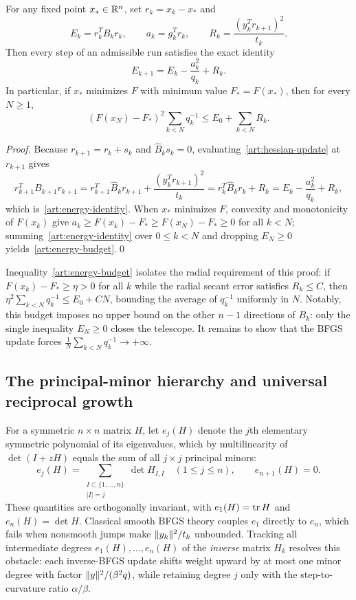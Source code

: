 \begin{lemma}\label{art:reference-energy}
For any fixed point $x_*\in\mathbb R^n$, set $r_k=x_k-x_*$ and
\[
 E_k=r_k^TB_kr_k,\qquad a_k=g_k^Tr_k,\qquad
 R_k=\frac{(y_k^Tr_{k+1})^2}{t_k}.
\]
Then every step of an admissible run satisfies the exact identity
\begin{equation}\label{art:energy-identity}
 E_{k+1}=E_k-\frac{a_k^2}{q_k}+R_k.
\end{equation}
In particular, if $x_*$ minimizes $F$ with minimum value $F_*=F(x_*)$, then for
every $N\ge1$,
\begin{equation}\label{art:energy-budget}
 (F(x_N)-F_*)^2\sum_{k<N}q_k^{-1}
       \le E_0+\sum_{k<N}R_k.
\end{equation}
\end{lemma}
\begin{proof}
Because $r_{k+1}=r_k+s_k$ and $\widehat B_ks_k=0$, evaluating~\eqref{art:hessian-update}
at $r_{k+1}$ gives
\[
 r_{k+1}^TB_{k+1}r_{k+1}
 =r_{k+1}^T\widehat B_kr_{k+1}+\frac{(y_k^Tr_{k+1})^2}{t_k}
 =r_k^T\widehat B_kr_k+R_k
 =E_k-\frac{a_k^2}{q_k}+R_k,
\]
which is~\eqref{art:energy-identity}. When $x_*$ minimizes $F$, convexity and
monotonicity of $F(x_k)$ give $a_k\ge F(x_k)-F_*\ge F(x_N)-F_*\ge0$ for all
$k<N$; summing~\eqref{art:energy-identity} over $0\le k<N$ and dropping
$E_N\ge0$ yields~\eqref{art:energy-budget}.\qed
\end{proof}

Inequality~\eqref{art:energy-budget} isolates the radial requirement of this
proof: if $F(x_k)-F_*\ge\eta>0$ for all $k$ while the radial secant error
satisfies $R_k\le C$, then $\eta^2\sum_{k<N}q_k^{-1}\le E_0+CN$, bounding the
average of $q_k^{-1}$ uniformly in $N$. Notably, this budget imposes no upper
bound on the other $n-1$ directions of $B_k$: only the single inequality
$E_N\ge0$ closes the telescope. It remains to show that
the BFGS update forces $\frac1N\sum_{k<N}q_k^{-1}\to+\infty$.

\subsection{The principal-minor hierarchy and universal reciprocal growth}

For a symmetric $n\times n$ matrix $H$, let $e_j(H)$ denote the $j$th elementary
symmetric polynomial of its eigenvalues, which by multilinearity of
$\det(I+zH)$ equals the sum of all $j\times j$ principal minors:
\[
 e_j(H)=\sum_{\substack{I\subset\{1,\ldots,n\}\\|I|=j}}\det H_{I,I}
 \quad(1\le j\le n),\qquad e_{n+1}(H)=0.
\]
These quantities are orthogonally invariant, with $e_1(H)=\operatorname{tr} H$ and
$e_n(H)=\det H$. Classical smooth BFGS theory couples $e_1$ directly to $e_n$,
which fails when nonsmooth jumps make $\lVert y_k\rVert^2/t_k$ unbounded. Tracking all
intermediate degrees $e_1(H),\ldots,e_n(H)$ of the \emph{inverse} matrix $H_k$
resolves this obstacle: each inverse-BFGS update shifts weight upward by at most
one minor degree with factor $\lVert y\rVert^2/(\beta^2q)$, while retaining degree $j$
only with the step-to-curvature ratio $\alpha/\beta$.

